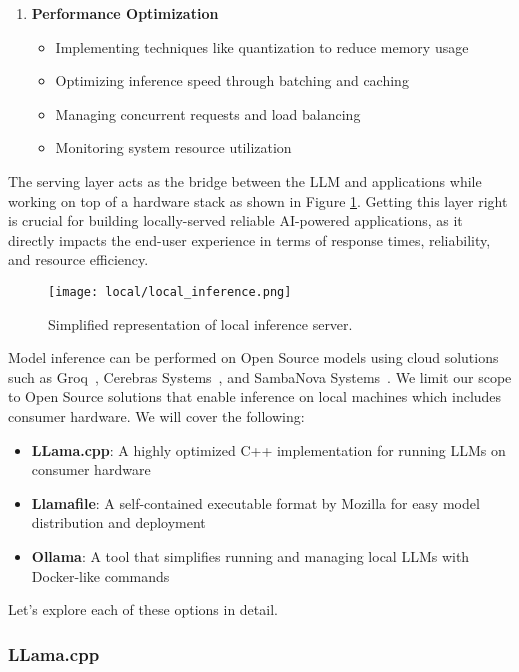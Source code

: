 \begin{enumerate}
\item \textbf{Performance Optimization}
\begin{itemize}
    \item Implementing techniques like quantization to reduce memory usage
    \item Optimizing inference speed through batching and caching
    \item Managing concurrent requests and load balancing
    \item Monitoring system resource utilization
\end{itemize}
\end{enumerate}

The serving layer acts as the bridge between the LLM and applications while working on top of a hardware stack as shown in Figure \ref{fig:local_inference}. Getting this layer right is crucial for building locally-served reliable AI-powered applications, as it directly impacts the end-user experience in terms of response times, reliability, and resource efficiency.

\begin{figure}[H]
\centering
\texttt{[image: local/local\_inference.png]}
\caption{Simplified representation of local inference server.}
\label{fig:local_inference}
\end{figure}

Model inference can be performed on Open Source models using cloud solutions such as Groq~, Cerebras Systems~, and SambaNova Systems~. We limit our scope to Open Source solutions that enable inference on local machines which includes consumer hardware. We will cover the following:

\begin{itemize}
    \item \textbf{LLama.cpp}: A highly optimized C++ implementation for running LLMs on consumer hardware
    \item \textbf{Llamafile}: A self-contained executable format by Mozilla for easy model distribution and deployment
    \item \textbf{Ollama}: A tool that simplifies running and managing local LLMs with Docker-like commands
\end{itemize}

Let's explore each of these options in detail.

\subsubsection{LLama.cpp}

